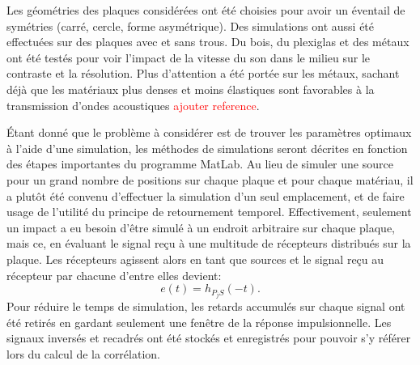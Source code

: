 \documentclass[conference]{IEEEtran}
\begin{document}

Les géométries des plaques considérées ont été choisies pour avoir un éventail de 
symétries (carré, cercle, forme asymétrique). Des simulations ont aussi été effectuées 
sur des plaques avec et sans trous. Du bois, du plexiglas et des métaux 
ont été testés pour voir l'impact de la vitesse du son dans le milieu sur
le contraste et la résolution. Plus d'attention a été portée sur les métaux,
sachant déjà que les matériaux plus denses et moins élastiques sont favorables à 
la transmission d'ondes acoustiques \textcolor{red}{ajouter reference}.

Étant donné que le problème à considérer est de trouver les paramètres 
optimaux à l'aide d'une simulation, les méthodes de simulations seront décrites
en fonction des étapes importantes du programme MatLab. Au lieu de simuler une source
pour un grand nombre de positions sur chaque plaque et pour chaque matériau, il a plutôt
été convenu d'effectuer la simulation d'un seul emplacement, et de faire usage de l'utilité
du principe de retournement temporel. Effectivement, seulement un impact a eu besoin
d'être simulé à un endroit arbitraire sur chaque plaque, mais ce, en évaluant le signal reçu
à une multitude de récepteurs distribués sur la plaque. Les récepteurs agissent alors en tant
que sources et le signal reçu au récepteur par chacune d'entre elles devient:
\[e(t)=h_{P_jS}(-t).\]
Pour réduire le temps de simulation, les retards accumulés sur chaque signal ont été 
retirés en gardant seulement une fenêtre de la réponse impulsionnelle. Les signaux inversés et 
recadrés ont été stockés et enregistrés pour pouvoir s'y référer lors du calcul de la corrélation.

\end{document}
